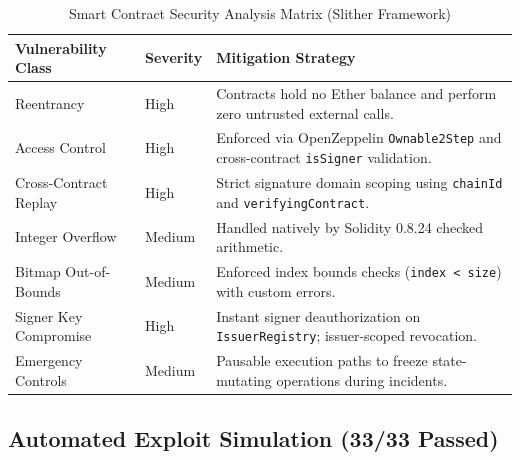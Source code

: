\begin{table}[H]
\centering
\renewcommand{\arraystretch}{1.3}
\begin{tabular}{|p{3.8cm}|>{\centering\arraybackslash}p{2.0cm}|>{\RaggedRight}p{8.5cm}|}
\hline
\textbf{Vulnerability Class} & \textbf{Severity} & \textbf{Mitigation Strategy} \\
\hline
Reentrancy & High & Contracts hold no Ether balance and perform zero untrusted external calls. \\
\hline
Access Control & High & Enforced via OpenZeppelin \texttt{Ownable2Step} and cross-contract \texttt{isSigner} validation. \\
\hline
Cross-Contract Replay & High & Strict signature domain scoping using \texttt{chainId} and \texttt{verifyingContract}. \\
\hline
Integer Overflow & Medium & Handled natively by Solidity 0.8.24 checked arithmetic. \\
\hline
Bitmap Out-of-Bounds & Medium & Enforced index bounds checks (\texttt{index < size}) with custom errors. \\
\hline
Signer Key Compromise & High & Instant signer deauthorization on \texttt{IssuerRegistry}; issuer-scoped revocation. \\
\hline
Emergency Controls & Medium & Pausable execution paths to freeze state-mutating operations during incidents. \\
\hline
\end{tabular}
\caption{Smart Contract Security Analysis Matrix (Slither Framework)}
\label{tab:security-checklist}
\end{table}

\subsection{Automated Exploit Simulation (33/33 Passed)}

